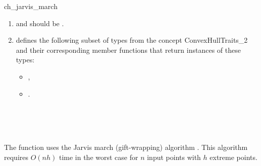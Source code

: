 \begin{ccRefFunction}{ch_jarvis_march}
\begin{enumerate}
   \item    {} and 
            should be .
   \item    {} defines the following subset of types from
            the concept ConvexHullTraits\_2 and their corresponding member
            functions that return instances of these types:
            \begin{itemize}
                \item {},
                \item {}.
            \end{itemize}
\end{enumerate}

\ccSeeAlso

 \\
 \\
 \\


\ccImplementation

The function uses the Jarvis march (gift-wrapping)
algorithm \cite{j-ichfs-73}. This algorithm requires $O(n h)$ time 
in the worst case for $n$ input points with $h$ extreme points.  
\end{ccRefFunction}


